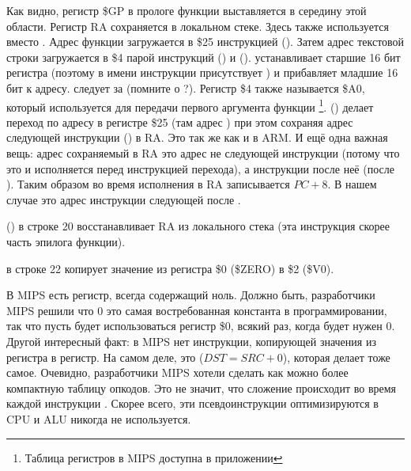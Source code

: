 

Как видно, регистр \$GP в прологе функции выставляется в середину этой области.
Регистр \ac{RA} сохраняется в локальном стеке.
Здесь также используется \puts вместо \printf.
Адрес функции \puts загружается в \$25 инструкцией  ().
Затем адрес текстовой строки загружается в \$4 парой инструкций  () и
 ().
 устанавливает старшие 16 бит регистра (поэтому в имени инструкции присутствует ) и 
прибавляет младшие 16 бит к адресу.
 следует за  (помните о ?).
Регистр \$4 также называется \$A0, который используется для передачи первого аргумента функции
\footnote{Таблица регистров в MIPS доступна в приложении }.
 () делает переход по адресу в регистре \$25 (там адрес \puts) 
при этом сохраняя адрес следующей инструкции () в \ac{RA}.
Это так же как и в ARM.
И ещё одна важная вещь: адрес сохраняемый в \ac{RA} это адрес не следующей инструкции (потому что
это  и исполняется перед инструкцией перехода),
а инструкции после неё (после ).
Таким образом во время исполнения  в \ac{RA} записывается $PC + 8$.
В нашем случае это адрес инструкции  следующей после .

 () в строке 20 восстанавливает \ac{RA} из локального стека (эта инструкция скорее часть эпилога функции).

 в строке 22 копирует значение из регистра \$0 (\$ZERO) в \$2 (\$V0).

\label{MIPS_zero_register}
В MIPS есть  регистр, всегда содержащий ноль.
Должно быть, разработчики MIPS решили что 0 это самая востребованная константа в программировании,
так что пусть будет использоваться регистр \$0, всякий раз, когда будет нужен 0.
Другой интересный факт: в MIPS нет инструкции, копирующей значения из регистра в регистр.
На самом деле,  это  ($DST=SRC+0$), которая делает тоже самое.
Очевидно, разработчики MIPS хотели сделать как можно более компактную таблицу опкодов.
Это не значит, что сложение происходит во время каждой инструкции .
Скорее всего, эти псевдоинструкции оптимизируются в \ac{CPU} и \ac{ALU} никогда не используется.

